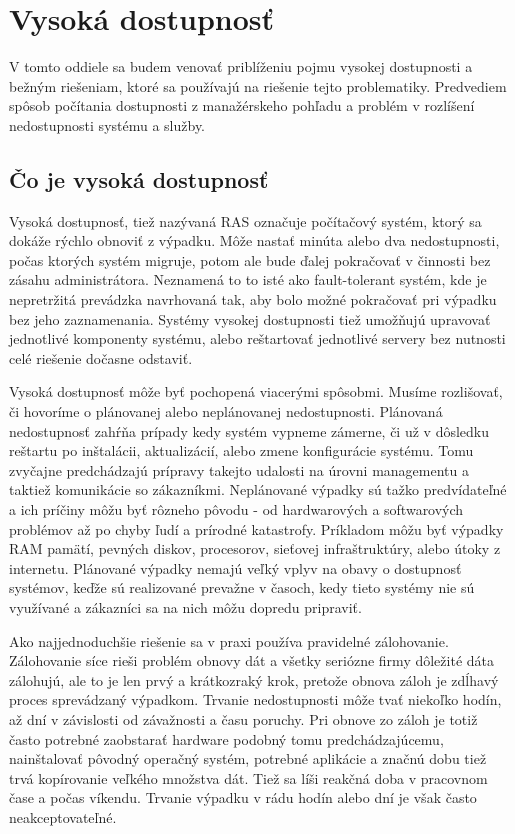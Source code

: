 \chapter{Vysoká dostupnosť}
V tomto oddiele sa budem venovať priblíženiu pojmu vysokej dostupnosti a bežným riešeniam, ktoré sa používajú na riešenie tejto problematiky. Predvediem spôsob počítania dostupnosti z manažérskeho pohľadu a problém v rozlíšení nedostupnosti systému a služby.

\section{Čo je vysoká dostupnosť}
Vysoká dostupnosť, tiež nazývaná \ac{RAS} označuje počítačový systém, ktorý sa dokáže rýchlo obnoviť z výpadku. Môže nastať minúta alebo dva nedostupnosti, počas ktorých systém migruje, potom ale bude ďalej pokračovať v činnosti bez zásahu administrátora. Neznamená to to isté ako fault-tolerant systém, kde je nepretržitá prevádzka navrhovaná tak, aby bolo možné pokračovať pri výpadku bez jeho zaznamenania. Systémy vysokej dostupnosti tiež umožňujú upravovať jednotlivé komponenty systému, alebo reštartovať jednotlivé servery bez nutnosti celé riešenie dočasne odstaviť\cite{web:pcmag.com-ha}.

Vysoká dostupnosť môže byť pochopená viacerými spôsobmi. Musíme rozlišovať, či hovoríme o plánovanej alebo neplánovanej nedostupnosti. Plánovaná nedostupnosť zahŕňa prípady kedy systém vypneme zámerne, či už v dôsledku reštartu po inštalácii, aktualizácií, alebo zmene konfigurácie systému. Tomu zvyčajne predchádzajú prípravy takejto udalosti na úrovni managementu a taktiež komunikácie so zákazníkmi. Neplánované výpadky sú tažko predvídateľné a ich príčiny môžu byť rôzneho pôvodu - od hardwarových a softwarových problémov až po chyby ľudí a prírodné katastrofy. Príkladom môžu byť výpadky RAM pamätí, pevných diskov, procesorov, sieťovej infraštruktúry, alebo útoky z internetu. Plánované výpadky nemajú veľký vplyv na obavy o dostupnosť systémov, keďže sú realizované prevažne v časoch, kedy tieto systémy nie sú využívané a zákazníci sa na nich môžu dopredu pripraviť.

Ako najjednoduchšie riešenie sa v praxi používa pravidelné zálohovanie. Zálohovanie síce rieši problém obnovy dát a všetky seriózne firmy dôležité dáta zálohujú, ale to je len prvý a krátkozraký krok, pretože obnova záloh je zdĺhavý proces sprevádzaný výpadkom. Trvanie nedostupnosti môže tvať niekoľko hodín, až dní v závislosti od závažnosti a času poruchy. Pri obnove zo záloh je totiž často potrebné zaobstarať hardware podobný tomu predchádzajúcemu, nainštalovať pôvodný operačný systém, potrebné aplikácie a značnú dobu tiež trvá kopírovanie veľkého množstva dát. Tiež sa líši reakčná doba v pracovnom čase a počas víkendu. Trvanie výpadku v rádu hodín alebo dní je však často neakceptovateľné.

